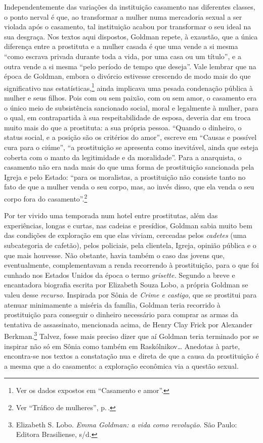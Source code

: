 Independentemente das variações da instituição casamento nas diferentes
classes, o ponto nerval é que, ao transformar a mulher
numa mercadoria sexual a ser violada
após o casamento, tal instituição acabou por transformar o seu ideal na sua desgraça.
Nos textos aqui dispostos, Goldman repete, à exaustão,
que a única diferença entre a prostituta e a mulher casada é que uma
vende a si mesma ``como escrava privada durante toda a vida, por uma
casa ou um título'', e a outra vende a si mesma ``pelo período de tempo
que deseja''. Vale lembrar que na época de Goldman, embora o divórcio
estivesse crescendo de modo mais do que significativo nas estatísticas,\footnote{Ver os dados expostos em ``Casamento e amor''.}
ainda implicava uma
pesada condenação pública à mulher e seus filhos. Pois com ou sem
paixão, com ou sem amor, o casamento era o único meio de subsistência
sancionado social, moral e legalmente à mulher, para o qual, em
contrapartida à sua respeitabilidade de esposa, deveria dar em troca
muito mais do que a prostituta: a sua própria pessoa. ``Quando o
dinheiro, o status social, e a posição são os critérios do amor'',
escreve em ``Causas e possível cura para o ciúme'', ``a prostituição se
apresenta como inevitável, ainda que esteja coberta com o manto da
legitimidade e da moralidade''. Para a anarquista, o casamento não era
nada mais do que uma forma de prostituição sancionada pela Igreja e pelo
Estado: ``para os moralistas, a prostituição não consiste tanto no fato de que a mulher
venda o seu corpo, mas, ao invés disso, que ela venda o seu corpo fora
do casamento''.\footnote{Ver ``Tráfico de mulheres'', p.\,\pageref{vender}.}

Por ter vivido uma temporada num hotel entre prostitutas, além das
experiências, longas e curtas, nas cadeias e presídios, Goldman sabia
muito bem das condições de exploração em que elas viviam, cerceadas
pelos \textit{cadetes} (uma subcategoria de cafetão), pelos policiais, pela
clientela, Igreja, opinião pública e o que mais houvesse. Não obstante,
havia também o caso das jovens que, eventualmente, complementavam a
renda recorrendo à prostituição, para o que foi cunhado nos Estados
Unidos da época o termo \emph{grisette.} Segundo a breve e encantadora
biografia escrita por Elizabeth Souza Lobo, a própria Goldman se valeu
desse \textit{recurso}. Inspirada por Sônia de \emph{Crime e castigo}, que se
prostitui para atenuar minimamente a miséria da família, Goldman
teria recorrido à prostituição para conseguir o
dinheiro necessário para comprar as armas da tentativa de assassinato,
mencionada acima, de Henry Clay Frick por Alexander Berkman.\footnote{Elizabeth S. Lobo. \textit{Emma Goldman: a vida como revolução}. São Paulo: Editora Brasiliense, s/d.}
Talvez, fosse mais preciso dizer que aí Goldman teria terminado por se
inspirar não só em Sônia como também em Raskólnikov\ldots{} Anedotas à parte,
encontra-se nos textos a constatação nua e
direta de que a causa da prostituição é a mesma que a do casamento: a
exploração econômica via a questão sexual.

